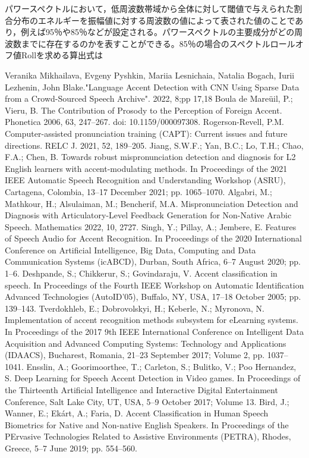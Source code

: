 パワースペクトルにおいて，低周波数帯域から全体に対して閾値で与えられた割合分布のエネルギーを振幅値に対する周波数の値によって表された値のことであり，例えば95％や85％などが設定される。パワースペクトルの主要成分がどの周波数までに存在するのかを表すことができる。85％の場合のスペクトルロールオフ値Rollを求める算出式は\documentclass[ams]{U-AizuGT}
\begin{document}
\clearpage
\begin{thebibliography}{}
\bibitem[1]{}Veranika Mikhailava, Evgeny Pyshkin, Mariia Lesnichaia, Natalia Bogach, Iurii Lezhenin, John Blake."Language Accent Detection with CNN Using Sparse Data from a Crowd-Sourced Speech Archive". 2022, 8;pp 17,18
\bibitem[2]{}Boula de Mareüil, P.; Vieru, B. The Contribution of Prosody to the Perception of Foreign Accent. Phonetica 2006, 63, 247–267. doi: 10.1159/000097308.
\bibitem[3]{}Rogerson-Revell, P.M. Computer-assisted pronunciation training (CAPT): Current issues and future directions. RELC J. 2021, 52, 189–205.
\bibitem[4]{}Jiang, S.W.F.; Yan, B.C.; Lo, T.H.; Chao, F.A.; Chen, B. Towards robust mispronunciation detection and diagnosis for L2 English learners with accent-modulating methods. In Proceedings of the 2021 IEEE Automatic Speech Recognition and Understanding Workshop (ASRU), Cartagena, Colombia, 13–17 December 2021; pp. 1065–1070.
\bibitem[5]{}Algabri, M.; Mathkour, H.; Alsulaiman, M.; Bencherif, M.A. Mispronunciation Detection and Diagnosis with Articulatory-Level Feedback Generation for Non-Native Arabic Speech. Mathematics 2022, 10, 2727. 
\bibitem[6]{}Singh, Y.; Pillay, A.; Jembere, E. Features of Speech Audio for Accent Recognition. In Proceedings of the 2020 International Conference on Artificial Intelligence, Big Data, Computing and Data Communication Systems (icABCD), Durban, South Africa, 6–7 August 2020; pp. 1–6.
\bibitem[7]{}Deshpande, S.; Chikkerur, S.; Govindaraju, V. Accent classification in speech. In Proceedings of the Fourth IEEE Workshop on Automatic Identification Advanced Technologies (AutoID’05), Buffalo, NY, USA, 17–18 October 2005; pp. 139–143.
\bibitem[8]{}Tverdokhleb, E.; Dobrovolskyi, H.; Keberle, N.; Myronova, N. Implementation of accent recognition methods subsystem for eLearning systems. In Proceedings of the 2017 9th IEEE International Conference on Intelligent Data Acquisition and Advanced Computing Systems: Technology and Applications (IDAACS), Bucharest, Romania, 21–23 September 2017; Volume 2, pp. 1037–1041.
\bibitem[9]{}Ensslin, A.; Goorimoorthee, T.; Carleton, S.; Bulitko, V.; Poo Hernandez, S. Deep Learning for Speech Accent Detection in Video games. In Proceedings of the Thirteenth Artificial Intelligence and Interactive Digital Entertainment Conference, Salt Lake City, UT, USA, 5–9 October 2017; Volume 13.
\bibitem[10]{}Bird, J.; Wanner, E.; Ekárt, A.; Faria, D. Accent Classification in Human Speech Biometrics for Native and Non-native English Speakers. In Proceedings of the PErvasive Technologies Related to Assistive Environments (PETRA), Rhodes, Greece, 5–7 June 2019; pp. 554–560. 

\end{thebibliography}
\end{document}
